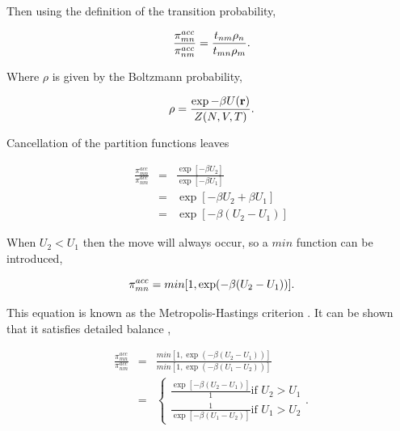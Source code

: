 Then using the definition of the transition probability,

\begin{equation}
\ \frac{\pi^{acc}_{mn}}{\pi^{acc}_{nm}} = \frac{t_{nm}\rho_n}{t_{mn}\rho_m} \\.
\end{equation}

Where $\rho$ is given by the Boltzmann probability,

\begin{equation}
\ \rho = \frac{\exp - \beta U(\mathbf{r})}{Z(N,V,T)} \\.
\end{equation}

Cancellation of the partition functions leaves

\begin{eqnarray}
\ \frac{\pi^{acc}_{mn}}{\pi^{acc}_{nm}} &=& \frac{\exp[ -\beta U_2 ]}{\exp [- \beta U_1]} \\
\ &=& \exp [ -\beta U_2 + \beta U_1 ] \\
\ &=& \exp [ - \beta ( U_2 - U_1) ]
\end{eqnarray}

When $U_2 < U_1$ then the move will always occur, so a $min$ function can be introduced,

\begin{equation}
\ \pi^{acc}_{mn}= min [ 1, \exp (- \beta (U_2 - U_1)) ] \\.
\end{equation}

This equation is known as the Metropolis-Hastings criterion \cite{metropolis-hastings}.  It can be shown that it satisfies detailed balance \cite{Hammersley_monte_carlo},

\begin{eqnarray}
\ \frac{\pi^{acc}_{mn}}{\pi^{acc}_{nm}} &=& \frac{min[1, \exp ( - \beta (U_2-U_1))]}{min[1, \exp ( - \beta (U_1-U_2))]} \\
 \ &=& \begin{cases} \frac{\exp [ - \beta (U_2-U_1)]}{1} \text{if $U_2 > U_1$} \\ \frac{1}{\exp [ - \beta (U_1-U_2)]} \text{if $U_1 > U_2$} \end{cases} .
\end{eqnarray}




\clearpage

